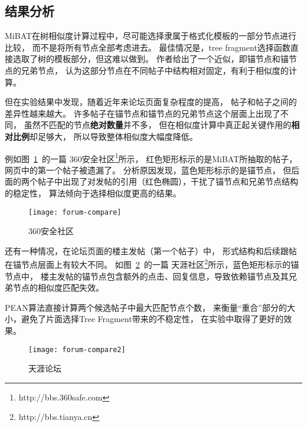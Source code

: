 \subsection{结果分析}

MiBAT在树相似度计算过程中，尽可能选择隶属于格式化模板的一部分节点进行比较，
而不是将所有节点全部考虑进去。
最佳情况是，tree fragment选择函数直接选取了树的模板部分，但这难以做到。
作者给出了一个近似，即锚节点和锚节点的兄弟节点，
认为这部分节点在不同帖子中结构相对固定，有利于相似度的计算。

但在实验结果中发现，随着近年来论坛页面复杂程度的提高，
帖子和帖子之间的差异性越来越大。
许多帖子在锚节点和锚节点的兄弟节点这个层面上出现了不同，
虽然不匹配的节点\textbf{绝对数量}并不多，
但在相似度计算中真正起关键作用的\textbf{相对比例}却足够大，
所以导致整体相似度大幅度降低。

例如图~\ref{fig:forum-compare}~的一篇
360安全社区\footnote{http://bbs.360safe.com}所示，
红色矩形标示的是MiBAT所抽取的帖子，网页中的第一个帖子被遗漏了。
分析原因发现，蓝色矩形标示的是锚节点，
但后面的两个帖子中出现了对发帖的引用（红色椭圆），干扰了锚节点和兄弟节点结构的稳定性，
算法倾向于选择相似度更高的结果。

\begin{figure}[htbp]
\centering
\texttt{[image: forum-compare]}
\caption{360安全社区}
\label{fig:forum-compare}
\end{figure}

还有一种情况，在论坛页面的楼主发帖（第一个帖子）中，
形式结构和后续跟帖在锚节点层面上有较大不同。
如图~\ref{fig:forum-compare2}~的一篇
天涯社区\footnote{http://bbs.tianya.cn}所示，蓝色矩形标示的锚节点中，
楼主发帖的锚节点包含额外的点击、回复信息，导致依赖锚节点及其兄弟节点的相似度匹配失效。

PEAN算法直接计算两个候选帖子中最大匹配节点个数，
来衡量“重合”部分的大小，避免了片面选择Tree Fragment带来的不稳定性，
在实验中取得了更好的效果。

\begin{figure}[htbp]
\centering
\texttt{[image: forum-compare2]}
\caption{天涯论坛}
\label{fig:forum-compare2}
\end{figure}
